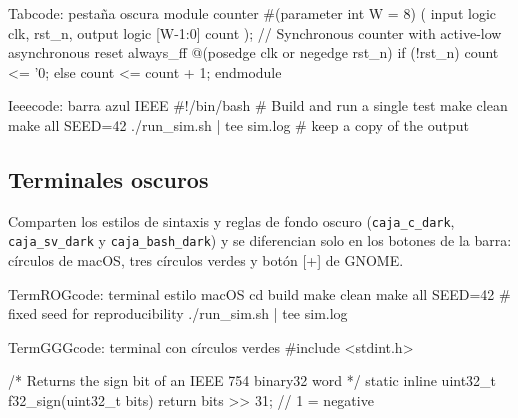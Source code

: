 \begin{codigo}
\begin{Tabcode}[caja_sv]{Tabcode: pestaña oscura}
module counter #(parameter int W = 8) (
  input  logic         clk, rst_n,
  output logic [W-1:0] count
);
  // Synchronous counter with active-low asynchronous reset
  always_ff @(posedge clk or negedge rst_n)
    if (!rst_n) count <= '0;
    else        count <= count + 1;
endmodule
\end{Tabcode}
\caption{Ejemplo con \texttt{Tabcode} y estilo \texttt{caja\_sv}.}
\label{lst:ej-tabcode}
\end{codigo}

\begin{codigo}
\begin{Ieeecode}{Ieeecode: barra azul IEEE}
#!/bin/bash
# Build and run a single test
make clean
make all SEED=42
./run_sim.sh | tee sim.log   # keep a copy of the output
\end{Ieeecode}
\caption{Ejemplo con \texttt{Ieeecode} y estilo \texttt{caja\_bash}.}
\label{lst:ej-ieeecode}
\end{codigo}

\subsection{Terminales oscuros}
\label{subsec:ej-code-terminal}

Comparten los estilos de sintaxis y reglas de fondo oscuro (\texttt{caja\_c\_dark}, \texttt{caja\_sv\_dark} y \texttt{caja\_bash\_dark}) y se diferencian solo en los botones de la barra: círculos de macOS, tres círculos verdes y botón [+] de GNOME.

\begin{codigo}
\begin{TermROGcode}{TermROGcode: terminal estilo macOS}
cd build
make clean
make all SEED=42   # fixed seed for reproducibility
./run_sim.sh | tee sim.log
\end{TermROGcode}
\caption{Ejemplo con \texttt{TermROGcode} y estilo \texttt{caja\_bash\_dark}.}
\label{lst:ej-termrog}
\end{codigo}

\begin{codigo}
\begin{TermGGGcode}{TermGGGcode: terminal con círculos verdes}
#include <stdint.h>

/* Returns the sign bit of an IEEE 754 binary32 word */
static inline uint32_t f32_sign(uint32_t bits) {
    return bits >> 31;   // 1 = negative
}
\end{TermGGGcode}
\caption{Ejemplo con \texttt{TermGGGcode} (estilo por defecto \texttt{caja\_c\_dark}).}
\label{lst:ej-termggg}
\end{codigo}


